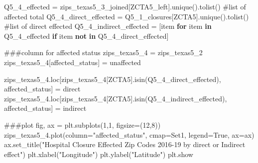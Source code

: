 \documentclass[
  letterpaper,
  DIV=11,
  numbers=noendperiod]{scrartcl}
\newenvironment{Shaded}{\begin{snugshade}}{\end{snugshade}}
\newcommand{\CommentTok}[1]{\textcolor[rgb]{0.37,0.37,0.37}{#1}}
\newcommand{\ControlFlowTok}[1]{\textcolor[rgb]{0.00,0.23,0.31}{\textbf{#1}}}
\newcommand{\DecValTok}[1]{\textcolor[rgb]{0.68,0.00,0.00}{#1}}
\newcommand{\KeywordTok}[1]{\textcolor[rgb]{0.00,0.23,0.31}{\textbf{#1}}}
\newcommand{\NormalTok}[1]{\textcolor[rgb]{0.00,0.23,0.31}{#1}}
\newcommand{\OperatorTok}[1]{\textcolor[rgb]{0.37,0.37,0.37}{#1}}
\newcommand{\StringTok}[1]{\textcolor[rgb]{0.13,0.47,0.30}{#1}}
\newcommand{\VariableTok}[1]{\textcolor[rgb]{0.07,0.07,0.07}{#1}}
\begin{document}
\begin{Shaded}
\begin{Highlighting}[]
\NormalTok{Q5\_4\_effected }\OperatorTok{=}\NormalTok{ zips\_texas5\_3\_joined[}\StringTok{\textquotesingle{}ZCTA5\_left\textquotesingle{}}\NormalTok{].unique().tolist() }\CommentTok{\#list of affected total}
\NormalTok{Q5\_4\_direct\_effected }\OperatorTok{=}\NormalTok{ Q5\_1\_closures[}\StringTok{\textquotesingle{}ZCTA5\textquotesingle{}}\NormalTok{].unique().tolist() }\CommentTok{\#list of direct effected }
\NormalTok{Q5\_4\_indirect\_effected }\OperatorTok{=}\NormalTok{ [item }\ControlFlowTok{for}\NormalTok{ item }\KeywordTok{in}\NormalTok{ Q5\_4\_effected }\ControlFlowTok{if}\NormalTok{ item }\KeywordTok{not} \KeywordTok{in}\NormalTok{ Q5\_4\_direct\_effected]}

\CommentTok{\#\#\#column for affected status }
\NormalTok{zips\_texas5\_4 }\OperatorTok{=}\NormalTok{ zips\_texas5\_2}
\NormalTok{zips\_texas5\_4[}\StringTok{\textquotesingle{}affected\_status\textquotesingle{}}\NormalTok{] }\OperatorTok{=} \StringTok{\textquotesingle{}unaffected\textquotesingle{}}

\NormalTok{zips\_texas5\_4.loc[zips\_texas5\_4[}\StringTok{\textquotesingle{}ZCTA5\textquotesingle{}}\NormalTok{].isin(Q5\_4\_direct\_effected), }\StringTok{\textquotesingle{}affected\_status\textquotesingle{}}\NormalTok{] }\OperatorTok{=} \StringTok{\textquotesingle{}direct\textquotesingle{}}
\NormalTok{zips\_texas5\_4.loc[zips\_texas5\_4[}\StringTok{\textquotesingle{}ZCTA5\textquotesingle{}}\NormalTok{].isin(Q5\_4\_indirect\_effected), }\StringTok{\textquotesingle{}affected\_status\textquotesingle{}}\NormalTok{] }\OperatorTok{=} \StringTok{\textquotesingle{}indirect\textquotesingle{}}

\CommentTok{\#\#\#plot }
\NormalTok{fig, ax }\OperatorTok{=}\NormalTok{ plt.subplots(}\DecValTok{1}\NormalTok{,}\DecValTok{1}\NormalTok{, figsize}\OperatorTok{=}\NormalTok{(}\DecValTok{12}\NormalTok{,}\DecValTok{8}\NormalTok{))}
\NormalTok{zips\_texas5\_4.plot(column}\OperatorTok{=}\StringTok{"affected\_status"}\NormalTok{, cmap}\OperatorTok{=}\StringTok{\textquotesingle{}Set1\textquotesingle{}}\NormalTok{, legend}\OperatorTok{=}\VariableTok{True}\NormalTok{, ax}\OperatorTok{=}\NormalTok{ax)}
\NormalTok{ax.set\_title(}\StringTok{"Hospital Closure Effected Zip Codes 2016{-}19 by direct or Indirect effect"}\NormalTok{)}
\NormalTok{plt.xlabel(}\StringTok{"Longitude"}\NormalTok{)}
\NormalTok{plt.ylabel(}\StringTok{"Latitude"}\NormalTok{)}
\NormalTok{plt.show}
\end{Highlighting}
\end{Shaded}
\end{document}
